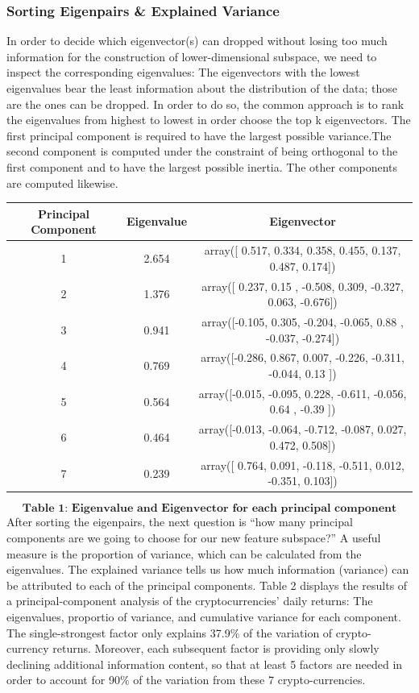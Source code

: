 \documentclass[12pt,twoside]{article}
\newcommand{\head}[1]{\textnormal{\textbf{#1}}}
\begin{document}
\subsubsection*{Sorting Eigenpairs \& Explained Variance}
\bigbreak
In order to decide which eigenvector(s) can dropped without losing too much information for the construction of lower-dimensional subspace, we need to inspect the corresponding eigenvalues: The eigenvectors with the lowest eigenvalues bear the least information about the distribution of the data; those are the ones can be dropped. In order to do so, the common approach is to rank the eigenvalues from highest to lowest in order choose the top k eigenvectors. The first principal component is required to have the largest possible variance.The second component is computed under the constraint of being orthogonal to the first component and to have the largest possible inertia. The other components are computed likewise.
\bigbreak
\begin{tabular}{ccc}
\hline
\head{Principal Component} & \head{Eigenvalue} & \head{Eigenvector}\\
\hline
1  & 2.654 & array([ 0.517,  0.334,  0.358,  0.455,  0.137,  0.487,  0.174])\\
2 & 1.376 &  array([ 0.237,  0.15 , -0.508,  0.309, -0.327,  0.063, -0.676])\\
3 & 0.941 & array([-0.105,  0.305, -0.204, -0.065,  0.88 , -0.037, -0.274])\\
4 & 0.769 & array([-0.286,  0.867,  0.007, -0.226, -0.311, -0.044,  0.13 ])\\
5 & 0.564 & array([-0.015, -0.095,  0.228, -0.611, -0.056,  0.64 , -0.39 ])\\
6 & 0.464 & array([-0.013, -0.064, -0.712, -0.087,  0.027,  0.472,  0.508])\\
7 & 0.239 & array([ 0.764,  0.091, -0.118, -0.511,  0.012, -0.351,  0.103])\\
\hline
\end{tabular}
$$\textbf{Table 1:  Eigenvalue and Eigenvector for each principal component}$$
\bigbreak
After sorting the eigenpairs, the next question is “how many principal components are we going to choose for our new feature subspace?” A useful measure is the proportion of variance, which can be calculated from the eigenvalues. The explained variance tells us how much information (variance) can be attributed to each of the principal components.
\bigbreak
Table 2 displays the results of a principal-component analysis of the cryptocurrencies’ daily returns: The eigenvalues, proportio of variance, and cumulative variance for each component. The single-strongest factor only explains 37.9$\%$ of the variation of crypto-currency returns. Moreover, each subsequent factor is providing only slowly declining additional information content, so that at least 5 factors are needed in order to account for 90$\%$ of the variation from these 7 crypto-currencies. 
\end{document}
